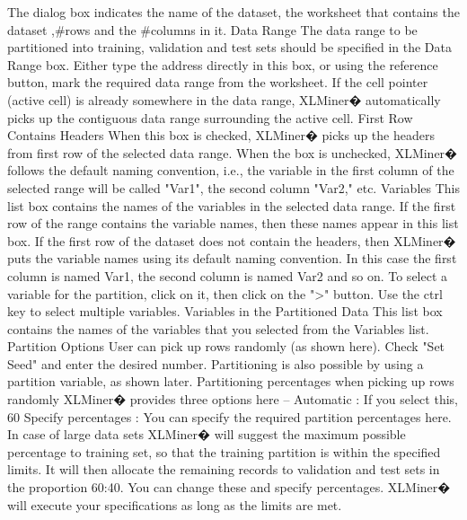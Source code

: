 The dialog box indicates the name of the dataset, the worksheet that contains the dataset ,#rows and the  #columns in it.
Data Range
The data range to be partitioned into training, validation and test sets should be specified in the Data Range box. Either type the address directly in this box, or using the reference button, mark the required data range from the worksheet. If the cell pointer (active cell) is already somewhere in the data range, XLMiner� automatically picks up the contiguous data range surrounding the active cell.
First Row Contains Headers
When this box is checked, XLMiner� picks up the headers from first row of the selected data range. When the box is unchecked, XLMiner� follows the default naming convention, i.e., the variable in the first column of the selected range will be called "Var1", the second column "Var2," etc.
Variables
This list box contains the names of the variables in the selected data range. If the first row of the range contains the variable names, then these names appear in this list box. If the first row of the dataset does not contain the headers, then XLMiner� puts the variable names using its default naming convention. In this case the first column is named Var1, the second column is named Var2 and so on.   To select a variable for the partition, click on it, then click on the ">" button.  Use the ctrl key to select multiple variables.
Variables in the Partitioned Data
This list box contains the names of the variables that you selected from the Variables list.
Partition Options
User can pick up rows randomly (as shown here). Check "Set Seed" and enter the desired number. Partitioning is also possible by using a partition variable, as shown later. 
Partitioning percentages when picking up rows randomly
XLMiner� provides three options here --
Automatic : If you select this, 60%
Specify percentages : You can specify the required partition percentages here. In case of large data sets XLMiner� will suggest the maximum possible percentage to training set, so that the training partition is within the specified limits. It will then allocate the remaining records to validation and test sets in the proportion 60:40. You can change these and specify percentages. XLMiner�  will execute your specifications as long as the limits are met. 
